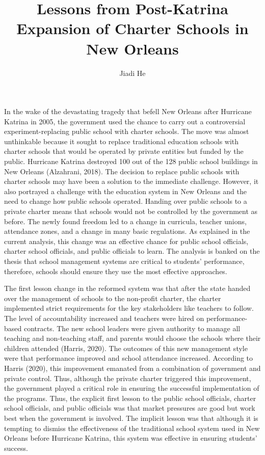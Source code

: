 \documentclass[11pt]{article}
\title{Lessons from Post-Katrina Expansion of Charter Schools in New Orleans}
\author{Jiadi He}
\affil{Georgetown University}
\begin{document}
\maketitle
\keywordsline

In the wake of the devastating tragedy that befell New Orleans after Hurricane Katrina in 2005, the government used the chance to carry out a controversial experiment-replacing public school with charter schools. The move was almost unthinkable because it sought to replace traditional education schools with charter schools that would be operated by private entities but funded by the public. Hurricane Katrina destroyed 100 out of the 128 public school buildings in New Orleans (Alzahrani, 2018). The decision to replace public schools with charter schools may have been a solution to the immediate challenge. However, it also portrayed a challenge with the education system in New Orleans and the need to change how public schools operated. Handing over public schools to a private charter means that schools would not be controlled by the government as before. The newly found freedom led to a change in curricula, teacher unions, attendance zones, and a change in many basic regulations. As explained in the current analysis, this change was an effective chance for public school officials, charter school officials, and public officials to learn. The analysis is banked on the thesis that school management systems are critical to students’ performance, therefore, schools should ensure they use the most effective approaches.

The first lesson change in the reformed system was that after the state handed over the management of schools to the non-profit charter, the charter implemented strict requirements for the key stakeholders like teachers to follow. The level of accountability increased and teachers were hired on performance-based contracts. The new school leaders were given authority to manage all teaching and non-teaching staff, and parents would choose the schools where their children attended (Harris, 2020). The outcomes of this new management style were that performance improved and school attendance increased. According to Harris (2020), this improvement emanated from a combination of government and private control. Thus, although the private charter triggered this improvement, the government played a critical role in ensuring the successful implementation of the programs. Thus, the explicit first lesson to the public school officials, charter school officials, and public officials was that market pressures are good but work best when the government is involved. The implicit lesson was that although it is tempting to dismiss the effectiveness of the traditional school system used in New Orleans before Hurricane Katrina, this system was effective in ensuring students' success.
\end{document}

